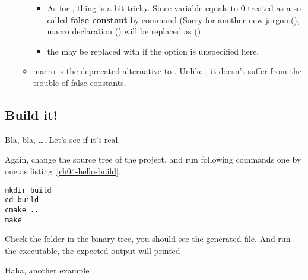 \begin{itemize}
\begin{itemize}
\begin{itemize}
          \item As for , thing is a bit tricky. Since variable  equals to 0 treated as a so-called \textbf{false constant} by  command (Sorry for another new jargon:(), macro declaration () will be replaced as (). 
          \item the  may be replaced with  if the  option is unspecified here.
        \end{itemize} 
      \item macro  is the deprecated alternative to . Unlike , it doesn't suffer from the trouble of false constants. 
    \end{itemize}  
\end{itemize}  
\subsection{Build it!}
Bla, bla, \dots. Let's see if it's real.\par
Again, change the source tree of the project, and run following commands one by one as listing~\ref{ch04-hello-build}. \par
\begin{lstlisting}[caption={Commands to build the project},label=ch04-hello-build]
mkdir build
cd build
cmake ..
make
\end{lstlisting}
Check the  folder in the binary tree, you should see the generated  file. And run the  executable, the expected output will printed~\par
Haha, another example~
